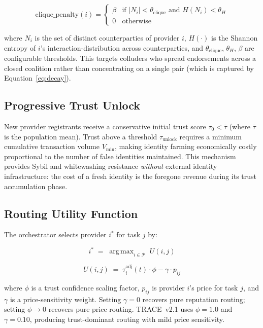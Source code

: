\documentclass[sigconf,nonacm,10pt]{acmart}
\DeclareMathOperator*{\argmax}{arg\,max}
\begin{document}
\begin{equation}
  \text{clique\_penalty}(i) =
  \begin{cases}
    \beta & \text{if } |N_i| < \theta_{\text{clique}}
            \text{ and } H(N_i) < \theta_H \\
    0     & \text{otherwise}
  \end{cases}
  \label{eq:clique}
\end{equation}

where $N_i$ is the set of distinct counterparties of provider $i$,
$H(\cdot)$ is the Shannon entropy of $i$'s interaction-distribution
across counterparties, and $\theta_{\text{clique}}$, $\theta_H$,
$\beta$ are configurable thresholds. This targets colluders who
spread endorsements across a closed coalition rather than
concentrating on a single pair (which is captured by
Equation~\ref{eq:decay}).

\subsection{Progressive Trust Unlock}

New provider registrants receive a conservative initial trust
score $\tau_0 < \overline{\tau}$ (where $\overline{\tau}$ is the
population mean). Trust above a threshold $\tau_{\text{unlock}}$
requires a minimum cumulative transaction volume $V_{\min}$, making
identity farming economically costly proportional to the number
of false identities maintained. This mechanism provides Sybil and
whitewashing resistance \emph{without} external identity
infrastructure: the cost of a fresh identity is the foregone
revenue during its trust accumulation phase.

\subsection{Routing Utility Function}
\label{sec:utility}

The orchestrator selects provider $i^*$ for task $j$ by:

\begin{equation}
  i^* \;=\; \argmax_{i \in \mathcal{P}} \; U(i, j)
  \label{eq:routing}
\end{equation}

\begin{equation}
  U(i, j) \;=\; \tau_i^{\text{adj}}(t) \cdot \phi
            - \gamma \cdot p_{ij}
  \label{eq:utility}
\end{equation}

where $\phi$ is a trust confidence scaling factor, $p_{ij}$ is
provider $i$'s price for task $j$, and $\gamma$ is a
price-sensitivity weight. Setting $\gamma = 0$ recovers pure
reputation routing; setting $\phi \to 0$ recovers pure price
routing. TRACE~v2.1 uses $\phi = 1.0$ and $\gamma = 0.10$,
producing trust-dominant routing with mild price sensitivity.
\end{document}
